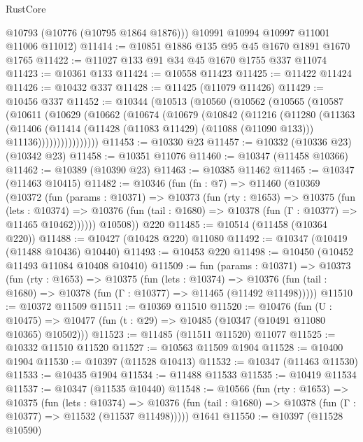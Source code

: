 \begin{lexlean}{RustCore}
\begin{coremodule}
        @10793
        (@10776 (@10795 @1864 @1876)))
      @10991
      @10994
      @10997
      @11001
      @11006
      @11012)
@11414 := @10851 @1886 @135 @95 @45 @1670 @1891 @1670 @1765
@11422 := @11027 @133 @91 @34 @45 @1670 @1755 @337 @11074
@11423 := @10361 @133
@11424 := @10558 @11423
@11425 := @11422 @11424
@11426 := @10432 @337
@11428 := @11425 (@11079 @11426)
@11429 := @10456 @337
@11452 := @10344
    (@10513
      (@10560
        (@10562
          (@10565
            (@10587
              (@10611
                (@10629
                  (@10662
                    (@10674
                      (@10679
                        (@10842
                          (@11216
                            (@11280
                              (@11363
                                (@11406
                                  (@11414
                                    (@11428 (@11083 @11429) (@11088 (@11090 @133)))
                                    @11136))))))))))))))))
@11453 := @10330 @23
@11457 := @10332 (@10336 @23) (@10342 @23)
@11458 := @10351 @11076
@11460 := @10347 (@11458 @10366)
@11462 := @10389 (@10390 @23)
@11463 := @10385 @11462
@11465 := @10347 (@11463 @10415)
@11482 := @10346
    (fun (fn : @7) =>
    @11460
      (@10369
        (@10372
          (fun (params : @10371) =>
          @10373
            (fun (rty : @1653) =>
            @10375
              (fun (lets : @10374) =>
              @10376 (fun (tail : @1680) => @10378 (fun (Γ : @10377) => @11465 @10462))))))
        @10508))
    @220
@11485 := @10514 (@11458 (@10364 @220))
@11488 := @10427 (@10428 @220) @11080
@11492 := @10347 (@10419 (@11488 @10436) @10440)
@11493 := @10453 @220
@11498 := @10450 (@10452 @11493 @11084 @10408 @10410)
@11509 := fun (params : @10371) =>
  @10373
    (fun (rty : @1653) =>
    @10375
      (fun (lets : @10374) =>
      @10376 (fun (tail : @1680) => @10378 (fun (Γ : @10377) => @11465 (@11492 @11498)))))
@11510 := @10372 @11509
@11511 := @10369 @11510
@11520 := @10476
    (fun (U : @10475) => @10477 (fun (t : @29) => @10485 (@10347 (@10491 @11080 @10365) @10502)))
@11523 := @11485 (@11511 @11520) @11077
@11525 := @10332 @11510 @11520
@11527 := @10563 @11509 @1904
@11528 := @10400 @1904
@11530 := @10397 (@11528 @10413)
@11532 := @10347 (@11463 @11530)
@11533 := @10435 @1904
@11534 := @11488 @11533
@11535 := @10419 @11534
@11537 := @10347 (@11535 @10440)
@11548 := @10566
    (fun (rty : @1653) =>
    @10375
      (fun (lets : @10374) =>
      @10376 (fun (tail : @1680) => @10378 (fun (Γ : @10377) => @11532 (@11537 @11498)))))
    @1641
@11550 := @10397 (@11528 @10590)

\end{coremodule}
\end{lexlean}
